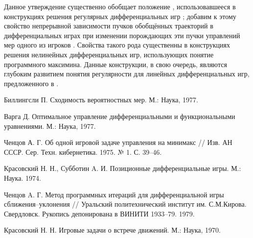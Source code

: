 Данное утверждение существенно обобщает положение \cite[Лемма П.2]{Chentsov}, использовавшееся в конструкциях решения регулярных дифференциальных игр \cite[глава VII]{KraSub};
добавим к этому свойство непрерывной зависимости пучков обобщённых траекторий в дифференциальных играх при изменении порождающих эти пучки управлений мер одного из игроков \cite{Chentsov-VINITI}.
Свойства такого рода существенны в конструкциях \cite{KraSub} решения нелинейных дифференциальных игр, использующих понятие программного максимина.
Данные конструкции, в свою очередь, являются глубоким развитием понятия регулярности для линейных дифференциальных игр, предложенного в  \cite{Kra}.





%

%

\begin{thebibliography}{9} %

Биллингсли П. Сходимость вероятностных мер. М.: Наука, 1977.

 Варга Д. Оптимальное управление дифференциальными и функциональными уравнениями. М.: Наука, 1977.

 Ченцов А. Г. Об одной игровой задаче управления на минимакс // Изв. АН СССР. Сер. Техн. кибернетика. 1975. № 1. С. 39--46.

 Красовский Н. Н., Субботин A. И. Позиционные дифференциальные игры. М.: Наука. 1974.

 Ченцов A. Г. Метод программных итераций для дифференциальной игры сближения–уклонения // Уральский политехнический институт им. С.М.Кирова. Свердловск. Рукопись депонирована в ВИНИТИ 1933–79. 1979.

 Красовский Н. Н. Игровые задачи о встрече движений. М.: Наука, 1970.

\end{thebibliography}





%

